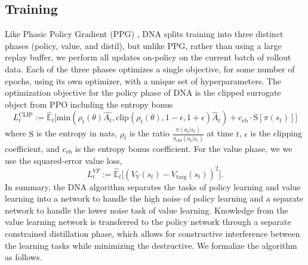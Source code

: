 \documentclass{article}
\begin{document}
\subsection{Training}

Like Phasic Policy Gradient (PPG) \cite{cobbe2021phasic}, DNA splits training into three distinct phases (policy, value, and distil), but unlike PPG, rather than using a large replay buffer, we perform all updates on-policy on the current batch of rollout data. Each of the three phases optimizes a single objective, for some number of epochs, using its own optimizer, with a unique set of hyperparameters. The optimization objective for the policy phase of DNA is the clipped surrogate object from PPO \cite{schulman2017proximal} including the entropy bonus 
\begin{equation}
    L^{\text{CLIP}}_t := \hat{\mathbb{E}}_t \bigg[ \text{min}( \rho_t(\theta)\hat{A_t}, \text{clip}(\rho_t(\theta), 1-\epsilon, 1+\epsilon)\hat{A}_t) + c_\text{eb} \cdot \text{S}[\pi(s_t)] \bigg]
\end{equation}
where $\text{S}$ is the entropy in nats, $\rho_t$ is the ratio $\frac{\pi(a_t|s_t)}{\pi_\text{old}(a_t|s_t)}$ at time $t$, $\epsilon$ is the clipping coefficient, and $c_\text{eb}$ is the entropy bonus coefficient. For the value phase, we we use the squared-error value loss, 
\begin{equation}
    L_t^{VF} := \mathbb{\hat{E}}_t \big[ (V_V(s_t)-V_{\text{targ}}(s_t))^{2} \big].
\end{equation}
In summary, the DNA algorithm separates the tasks of policy learning and value learning into a network to handle the high noise of policy learning and a separate network to handle the lower noise task of value learning. Knowledge from the value learning network is transferred to the policy network through a separate constrained distillation phase, which allows for constructive interference between the learning tasks while minimizing the destructive. We formalize the algorithm as follows.
\end{document}
